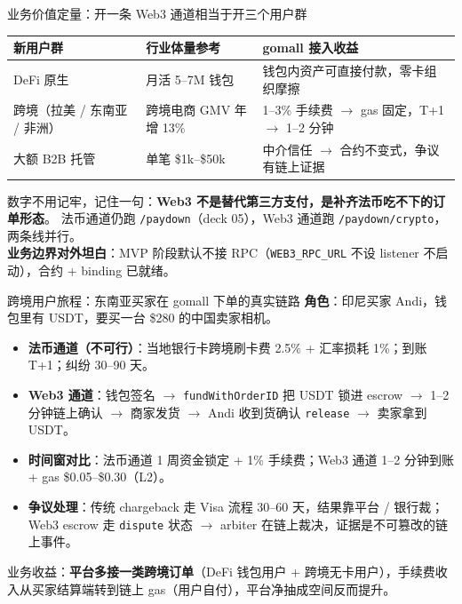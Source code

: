 \documentclass[aspectratio=169,11pt]{beamer}
\begin{document}
\begin{frame}[shrink]{业务价值定量：开一条 Web3 通道相当于开三个用户群}
\begin{tabular}{@{}lll@{}}
\toprule
新用户群 & 行业体量参考 & gomall 接入收益 \\
\midrule
DeFi 原生  & 月活 5--7M 钱包 & 钱包内资产可直接付款，零卡组织摩擦 \\
跨境（拉美 / 东南亚 / 非洲） & 跨境电商 GMV 年增 13\% & 1--3\% 手续费 $\to$ gas 固定，T+1 $\to$ 1--2 分钟 \\
大额 B2B 托管 & 单笔 \$1k--\$50k & 中介信任 $\to$ 合约不变式，争议有链上证据 \\
\bottomrule
\end{tabular}
\vspace{2mm}
\small 数字不用记牢，记住一句：\textbf{Web3 不是替代第三方支付，是补齐法币吃不下的订单形态}。
法币通道仍跑 \texttt{/paydown}（deck 05），Web3 通道跑 \texttt{/paydown/crypto}，两条线并行。\\
\textbf{业务边界对外坦白}：MVP 阶段默认不接 RPC（\texttt{WEB3\_RPC\_URL} 不设 listener 不启动），合约 + binding 已就绪。
\end{frame}

\begin{frame}[shrink]{跨境用户旅程：东南亚买家在 gomall 下单的真实链路}
\textbf{角色}：印尼买家 Andi，钱包里有 USDT，要买一台 \$280 的中国卖家相机。
\begin{itemize}
  \item \textbf{法币通道（不可行）}：当地银行卡跨境刷卡费 2.5\% + 汇率损耗 1\%；到账 T+1；纠纷 30--90 天。
  \item \textbf{Web3 通道}：钱包签名 $\to$ \texttt{fundWithOrderID} 把 USDT 锁进 escrow $\to$ 1--2 分钟链上确认 $\to$ 商家发货 $\to$ Andi 收到货确认 \texttt{release} $\to$ 卖家拿到 USDT。
  \item \textbf{时间窗对比}：法币通道 1 周资金锁定 + 1\% 手续费；Web3 通道 1--2 分钟到账 + gas \$0.05--\$0.30（L2）。
  \item \textbf{争议处理}：传统 chargeback 走 Visa 流程 30--60 天，结果靠平台 / 银行裁；Web3 escrow 走 \texttt{dispute} 状态 $\to$ arbiter 在链上裁决，证据是不可篡改的链上事件。
\end{itemize}
\vspace{1mm}
\small 业务收益：\textbf{平台多接一类跨境订单}（DeFi 钱包用户 + 跨境无卡用户），手续费收入从买家结算端转到链上 gas（用户自付），平台净抽成空间反而提升。
\end{frame}
\end{document}
